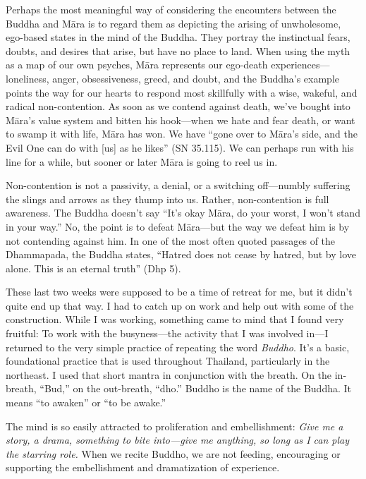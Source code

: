Perhaps the most meaningful way of considering the encounters between 
the Buddha and Māra is to regard them as depicting the arising of 
unwholesome, ego-based states in the mind of the Buddha. They portray 
the instinctual fears, doubts, and desires that arise, but have no 
place to land. When using the myth as a map of our own psyches, Māra 
represents our ego-death experiences---loneliness, anger, 
obsessiveness, greed, and doubt, and the Buddha's example points the 
way for our hearts to respond most skillfully with a wise, wakeful, and 
radical non-contention. As soon as we contend against death, we've 
bought into Māra's value system and bitten his hook---when we hate and 
fear death, or want to swamp it with life, Māra has won. We have 
``gone over to Māra's side, and the Evil One can do with [us] as he 
likes'' (SN 35.115). We can perhaps run with his line for a while, but 
sooner or later Māra is going to reel us in.

Non-contention is not a passivity, a denial, or a switching 
off---numbly suffering the slings and arrows as they thump into us. 
Rather, non-contention is full awareness. The Buddha doesn't say ``It's 
okay Māra, do your worst, I won't stand in your way.'' No, the point 
is to defeat Māra---but the way we defeat him is by not contending 
against him. In one of the most often quoted passages of the 
Dhammapada, the Buddha states, ``Hatred does not cease by hatred, but 
by love alone. This is an eternal truth'' (Dhp 5).


These last two weeks were supposed to be a time of retreat for me, but 
it didn't quite end up that way. I had to catch up on work and help out 
with some of the construction. While I was working, something came to 
mind that I found very fruitful: To work with the busyness---the 
activity that I was involved in---I returned to the very simple 
practice of repeating the word \emph{Buddho}. It's a basic, 
foundational practice that is used throughout Thailand, particularly in 
the northeast. I used that short mantra in conjunction with the breath. 
On the in-breath, ``Bud,'' on the out-breath, ``dho.'' Buddho is the 
name of the Buddha. It means ``to awaken'' or ``to be awake.''

The mind is so easily attracted to proliferation and embellishment: 
\emph{Give me a story, a drama, something to bite into---give me 
anything, so long as I can play the starring role.} When we recite 
Buddho, we are not feeding, encouraging or supporting the embellishment 
and dramatization of experience.


